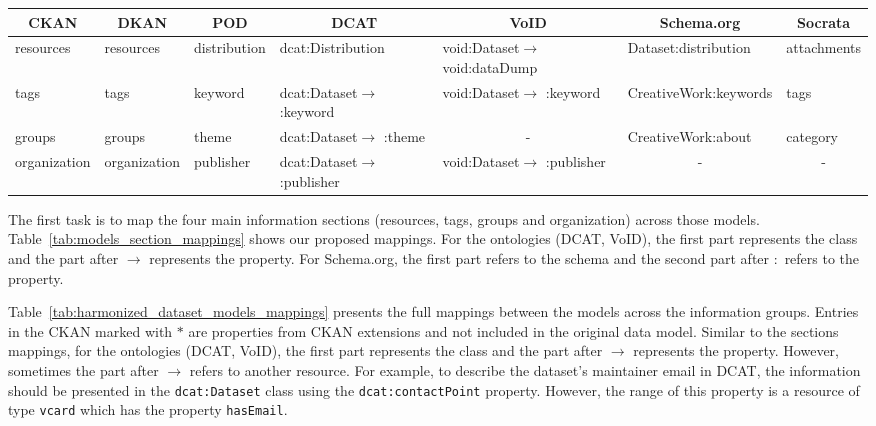 \begin{adjustwidth}{-.6in}{-.6in}
	\tiny
	\begin{tabular}{|l|l|l|l|l|l|l|}
		\hline
		\multicolumn{1}{|c|}{\textbf{CKAN}} & \multicolumn{1}{c|}{\textbf{DKAN}} & \multicolumn{1}{c|}{\textbf{POD}} & \multicolumn{1}{c|}{\textbf{DCAT}}     & \multicolumn{1}{c|}{\textbf{VoID}}     & \multicolumn{1}{c|}{\textbf{Schema.org}} & \multicolumn{1}{c|}{\textbf{Socrata}} \\ \hline
		resources                           & resources                          & distribution                      & dcat:Distribution                      & void:Dataset$\rightarrow$ void:dataDump & Dataset:distribution                    & attachments                           \\ \hline
		tags                                & tags                               & keyword                           & dcat:Dataset$\rightarrow$ :keyword   & void:Dataset$\rightarrow$ :keyword   & CreativeWork:keywords                     & tags                                  \\ \hline
		groups                              & groups                             & theme                             & dcat:Dataset$\rightarrow$ :theme     &   \multicolumn{1}{c|}{-}                                      & CreativeWork:about                       & category                              \\ \hline
		organization                        & organization                       & publisher                         & dcat:Dataset$\rightarrow$ :publisher &   void:Dataset$\rightarrow$ :publisher                                     & \multicolumn{1}{c|}{-}                   & \multicolumn{1}{c|}{-}                                      \\ \hline
	\end{tabular}
	\label{tab:models_section_mappings}
\end{adjustwidth}

The first task is to map the four main information sections (resources, tags, groups and organization) across those models. Table~\ref{tab:models_section_mappings} shows our proposed mappings. For the ontologies (DCAT, VoID), the first part represents the class and the part after $\rightarrow$ represents the property. For Schema.org, the first part refers to the schema and the second part after $:$ refers to the property.

Table~\ref{tab:harmonized_dataset_models_mappings} presents the full mappings between the models across the information groups. Entries in the CKAN marked with $\ast$ are properties from CKAN extensions and not included in the original data model. Similar to the sections mappings, for the ontologies (DCAT, VoID), the first part represents the class and the part after $\rightarrow$ represents the property. However, sometimes the part after $\rightarrow$ refers to another resource. For example, to describe the dataset's maintainer email in DCAT, the information should be presented in the \texttt{dcat:Dataset} class using the \texttt{dcat:contactPoint} property. However, the range of this property is a resource of type \texttt{vcard} which has the property \texttt{hasEmail}.

